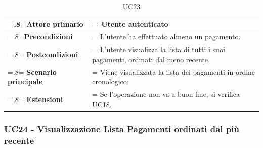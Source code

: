                 \begin{table}[H]
                    \centering
                    \renewcommand{\arraystretch}{1.8}
                    \renewcommand\tabularxcolumn[1]{m{#1}}
                    \begin{tabularx}{0.9\textwidth} {
                        >{\hsize=.8\hsize\linewidth=\hsize}X
                        >{\hsize=1.2\hsize\linewidth=\hsize}X}
                        \hline
                        \textbf{Attore primario} & Utente autenticato \\
                        \hline
                        \textbf{Precondizioni} & L'utente ha effettuato almeno un pagamento. \\
                        \hline
                        \textbf{Postcondizioni} & L'utente visualizza la lista di tutti i suoi pagamenti, ordinati dal meno recente. \\
                        \hline
                        \textbf{Scenario principale} & Viene visualizzata la lista dei pagamenti in ordine cronologico. \\
                        \hline
                        \textbf{Estensioni} & Se l'operazione non va a buon fine, si verifica \hyperref[UC18]{UC18}. \\
                        \hline
                    \end{tabularx}
                    \caption{UC23}
                \end{table}

        \subsubsection{UC24 - Visualizzazione Lista Pagamenti ordinati dal più recente}
        \label{UC24}

